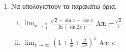 


\everymath{\displaystyle}



\begin{center}
\end{center}

\vspace{\baselineskip}

\begin{enumerate}
	\item Να υπολογιστούν τα παρακάτω όρια.
\begin{enumerate}[i)]

	\item $ \lim_{x\to \frac{\pi}{4}} \frac{\sqrt{2} - \sin{x} -
		\cos{x}}{\ln{(\sin{2x})}} $ \hfill Απ: $ -\frac{\sqrt{2}}{4} $

	\item $ \lim_{x\to\infty}\left(1 + \frac{1}{x} + \frac{2}{x^{2}}\right)^{x} $ \hfill Απ: $ e	$

\end{enumerate}
\end{enumerate}


